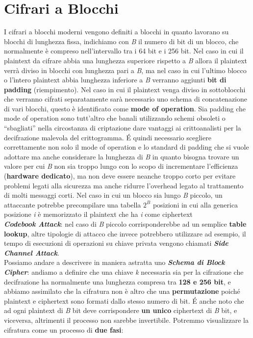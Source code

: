 \section{Cifrari a Blocchi}
I cifrari a blocchi moderni vengono definiti a blocchi in quanto lavorano su blocchi di lunghezza fissa, indichiamo con \textit{B} il numero di bit di un blocco, che normalmente è compreso nell'intervallo tra i 64 bit e i 256 bit. Nel caso in cui il plaintext da cifrare abbia una lunghezza superiore rispetto a \textit{B} allora il plaintext verrà diviso in blocchi con lunghezza pari a \textit{B}, ma nel caso in cui l'ultimo blocco o l'ìntero plaintext abbia lunghezza inferiore a \textit{B} verranno aggiunti \textbf{bit di padding} (riempimento). Nel caso in cui il plaintext venga diviso in sottoblocchi che verranno cifrati separatamente sarà necessario uno schema di concatenazione di vari blocchi, questo è identificato come \textbf{mode of operation}.
\newline
Sia padding che mode of operation sono tutt'altro che banali utilizzando schemi obsoleti o ``sbagliati'' nella circostanza di criptazione dare vantaggi ai crittoanalisti per la decifrazione malevola del crittogramma.
\newline
\'{E} quindi necessario scegliere correttamente non solo il mode of operation e lo standard di padding che si vuole adottare ma anche considerare la lunghezza di \textit{B} in quanto bisogna trovare un valore per cui \textit{B} non sia troppo lungo con lo scopo di incrementare l'efficienza (\textbf{hardware dedicato}), ma non deve essere neanche troppo corto per evitare problemi legati alla sicurezza ma anche ridurre l'overhead legato al trattamento di molti messaggi corti. Nel caso in cui un blocco sia lungo \textit{B} piccolo, un attaccante potrebbe precompilare una tabella $2^\textit{B}$ posizioni in cui alla generica posizione \textit{i} è memorizzato il plaintext che ha \textit{i} come ciphertext
\\ \newline
\textbf{\textit{Codebook Attack}}: nel caso di \textit{B} piccolo corrisponderebbe ad un semplice \textbf{table lookup}, altre tipologie di attacco che invece potrebbero utilizzare ad esempio, il tempo di esecuzioni di operazioni su chiave privata vengono chiamati \textbf{\textit{Side Channel Attack}}.
\\ \newline
Possiamo andare a descrivere in maniera astratta uno \textbf{\textit{Schema di Block Cipher}}: andiamo a definire che una chiave \textit{k} necessaria sia per la cifrazione che decifrazione ha normalmente una lunghezza compresa tra \textbf{128 e 256 bit}, e abbiamo assimilato che la cifratura non è altro che una \textbf{permutazione} poiché plaintext e ciphertext sono formati dallo stesso numero di bit. \'{E} anche noto che ad ogni plaintext di \textit{B} bit deve corrispondere \textbf{un unico} ciphertext di \textit{B} bit, e viceversa, altrimenti il processo non sarebbe invertibile. Potremmo visualizzare la cifratura come un processo di \textbf{due fasi}:
